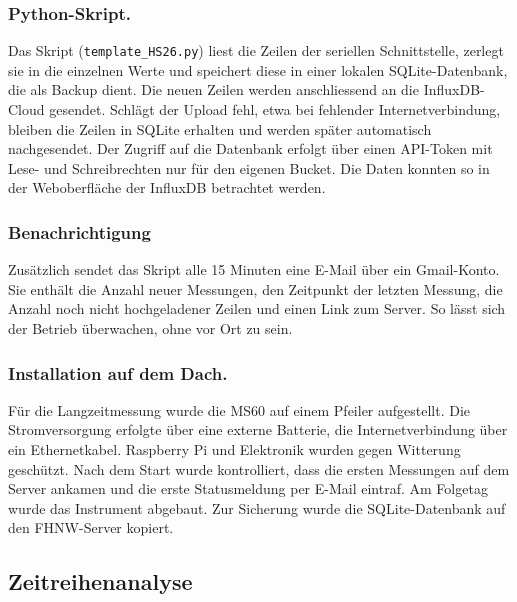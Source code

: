 \subsubsection{Python-Skript.}
Das Skript (\texttt{template\_HS26.py}) liest die Zeilen der seriellen Schnittstelle, zerlegt sie in die einzelnen
Werte und speichert diese in einer lokalen SQLite-Datenbank, die als Backup dient. Die neuen Zeilen werden
anschliessend an die InfluxDB-Cloud gesendet. Schlägt der Upload fehl, etwa bei fehlender Internetverbindung,
bleiben die Zeilen in SQLite erhalten und werden später automatisch nachgesendet. Der Zugriff auf die Datenbank
erfolgt über einen API-Token mit Lese- und Schreibrechten nur für den eigenen Bucket. Die Daten konnten so in der
Weboberfläche der InfluxDB betrachtet werden.

\subsubsection{Benachrichtigung}
Zusätzlich sendet das Skript alle 15 Minuten eine E-Mail über ein Gmail-Konto. Sie enthält die
Anzahl neuer Messungen, den Zeitpunkt der letzten Messung, die Anzahl noch nicht hochgeladener Zeilen und einen
Link zum Server. So lässt sich der Betrieb überwachen, ohne vor Ort zu sein.

\subsubsection{Installation auf dem Dach.}
Für die Langzeitmessung wurde die MS60 auf einem Pfeiler aufgestellt. Die Stromversorgung erfolgte über eine
externe Batterie, die Internetverbindung über ein Ethernetkabel. Raspberry Pi und Elektronik wurden gegen
Witterung geschützt. Nach dem Start wurde kontrolliert, dass die ersten Messungen auf dem Server ankamen und die
erste Statusmeldung per E-Mail eintraf. Am Folgetag wurde das Instrument abgebaut. Zur Sicherung wurde die
SQLite-Datenbank auf den FHNW-Server kopiert.

\subsection{Zeitreihenanalyse}
\label{sec:Zeitreihenanalyse}

